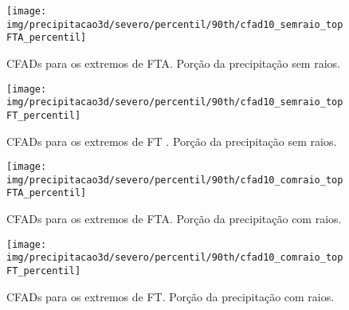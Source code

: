 \begin{sidewaysfigure}%
\centering
\texttt{[image: img/precipitacao3d/severo/percentil/90th/cfad10\_semraio\_topFTA\_percentil]}
\caption{CFADs para os extremos de FTA. Porção da precipitação sem raios.}
\label{ftacfadwithout}
\end{sidewaysfigure} 


\begin{sidewaysfigure}%
\centering
\texttt{[image: img/precipitacao3d/severo/percentil/90th/cfad10\_semraio\_topFT\_percentil]}
\caption{CFADs para os extremos de FT	. Porção da precipitação sem raios.}
\label{ftcfadwithout}
\end{sidewaysfigure} 


\begin{sidewaysfigure}%
  \centering
  \texttt{[image: img/precipitacao3d/severo/percentil/90th/cfad10\_comraio\_topFTA\_percentil]}
  \caption{CFADs para os extremos de FTA. Porção da precipitação com raios.}
  \label{ftacfadwith}   
\end{sidewaysfigure} 


\begin{sidewaysfigure}%
  \centering
  \texttt{[image: img/precipitacao3d/severo/percentil/90th/cfad10\_comraio\_topFT\_percentil]}
  \caption{CFADs para os extremos de FT. Porção da precipitação com raios.}
  \label{ftcfadwith}   
\end{sidewaysfigure} 


	

